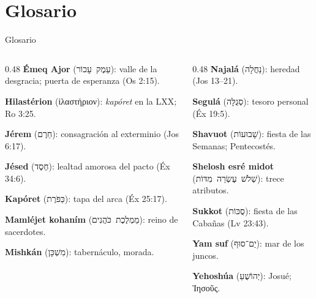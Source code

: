 \documentclass[hyperref={bookmarks=false},aspectratio=169]{beamer}
\newcommand{\heb}[1]{\mbox{\foreignlanguage{hebrew}{#1}}}
\newcommand{\grc}[1]{\foreignlanguage{ancientgreek}{#1}}
\begin{document}
\section{Glosario}
\begin{frame}{Glosario}
\begin{columns}[T,onlytextwidth]
\begin{column}{0.48\textwidth}\scriptsize
\textbf{Émeq Ajor} (\heb{עֵמֶק עָכוֹר}): valle de la desgracia; puerta de esperanza (Os 2:15).\par\medskip
\textbf{Hilastérion} (\grc{ἱλαστήριον}): \emph{kapóret} en la LXX; Ro 3:25.\par\medskip
\textbf{Jérem} (\heb{חֵרֶם}): consagración al exterminio (Jos 6:17).\par\medskip
\textbf{Jésed} (\heb{חֶסֶד}): lealtad amorosa del pacto (Éx 34:6).\par\medskip
\textbf{Kapóret} (\heb{כַּפֹּרֶת}): tapa del arca (Éx 25:17).\par\medskip
\textbf{Mamléjet kohaním} (\heb{מַמְלֶכֶת כֹּהֲנִים}): reino de sacerdotes.\par\medskip
\textbf{Mishkán} (\heb{מִשְׁכָּן}): tabernáculo, morada.
\end{column}
\begin{column}{0.48\textwidth}\scriptsize
\textbf{Najalá} (\heb{נַחֲלָה}): heredad (Jos 13--21).\par\medskip
\textbf{Segulá} (\heb{סְגֻלָּה}): tesoro personal (Éx 19:5).\par\medskip
\textbf{Shavuot} (\heb{שָׁבוּעוֹת}): fiesta de las Semanas; Pentecostés.\par\medskip
\textbf{Shelosh esré midot} (\heb{שְׁלֹשׁ עֶשְׂרֵה מִדּוֹת}): trece atributos.\par\medskip
\textbf{Sukkot} (\heb{סֻכּוֹת}): fiesta de las Cabañas (Lv 23:43).\par\medskip
\textbf{Yam suf} (\heb{יַם־סוּף}): mar de los juncos.\par\medskip
\textbf{Yehoshúa} (\heb{יְהוֹשֻׁעַ}): Josué; \grc{Ἰησοῦς}.
\end{column}
\end{columns}
\end{frame}

\end{document}
